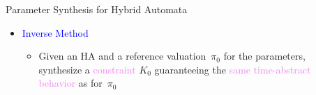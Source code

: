 \documentclass[final]{beamer}
\newcommand{\refer}[1]{\textcolor{blue}{\cite{#1}}}
\newcommand{\pio}{\pi_0}
\newcommand{\couleur}[1]{\textcolor{violet}{#1}}
\newcommand{\coulitem}[1]{\textcolor{blue}{#1}}
\begin{document}
\begin{frame}{}
\begin{columns}[t]
\begin{column}{.45\linewidth}
% 
% 



\end{column}





\begin{column}{.45\linewidth}



\begin{block}{Parameter Synthesis for Hybrid Automata}

\begin{itemize}
	\item \coulitem{Inverse Method}~\refer{FK11}
	\begin{itemize}
		\item Given an HA and a reference valuation~$\pio$ for the parameters, synthesize a \couleur{constraint} $K_0$ guaranteeing the \couleur{same time-abstract behavior} as for~$\pio$

  \begin{center}
\end{center}
\end{itemize}
\end{itemize}
\end{block}
\end{column}
\end{columns}
\end{frame}
\end{document}
